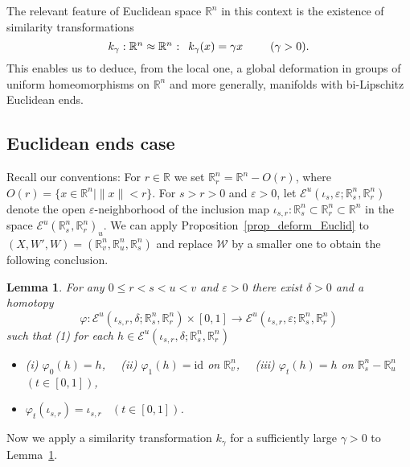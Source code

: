 \documentclass[11pt, fleqn]{amsart}
\newtheorem{lemma}{Lemma}[section]
\theoremstyle{definition}
\renewcommand{\phi}{\varphi}
\newcommand{\lra}{\longrightarrow}
\newcommand{\e}{\varepsilon}
\newcommand{\id}{\mathrm{id}}
\newcommand{\E}{\mathcal E}
\newcommand{\W}{\mathcal W}
\newcommand{\IR}{\mathbb R}
\begin{document}
The relevant feature of Euclidean space $\IR^n$ in this context is the existence of similarity transformations 
$$\mbox{$k_\gamma : \IR^n \approx \IR^n$ : \ $k_\gamma(x) = \gamma x$ \hspace{5mm} \ $(\gamma > 0)$.}$$
This enables us to deduce, from the local one, a global deformation in groups of uniform homeomorphisms on $\IR^n$ 
and more generally, manifolds with bi-Lipschitz Euclidean ends. 

\subsection{Euclidean ends case} \mbox{} 

Recall our conventions: For $r \in \IR$ we set $\IR^n_r = \IR^n - O(r)$, where $O(r) = \{ x \in \IR^n \mid \| x \| < r \}$. 
For $s > r > 0$ and $\e > 0$, let $\E^u(\iota_s, \e; \IR^n_s, \IR^n_r)$ denote the open $\e$-neighborhood of the inclusion map $\iota_{s,r} : \IR^n_s \subset \IR^n_r \subset \IR^n$ in the space $\E^u(\IR^n_s, \IR^n_r)_u.$
We can apply Proposition~\ref{prop_deform_Euclid} to $(X, W', W) = (\IR^n_v, \IR^n_u, \IR^n_s)$ and replace $\W$ by a smaller one to obtain the following conclusion. 

\begin{lemma}\label{lemma_local_deform_E-end} 
For any $0 \leq r < s < u < v$ and $\e > 0$ there exist $\delta > 0$ and a homotopy 
$$\phi : \E^u(\iota_{s,r}, \delta; \IR^n_s, \IR^n_r) \times [0,1] \lra \E^u(\iota_{s,r}, \e; \IR^n_s, \IR^n_r)$$ 
such that {\rm (1)} for each $h \in \E^u(\iota_{s,r}, \delta; \IR^n_s, \IR^n_r)$ 
\begin{itemize}
\item[] \hspace*{8mm} {\rm (i)} $\phi_0(h) = h$, \ \ {\rm (ii)} $\phi_1(h) = \id$ on $\IR^n_v$, \ \ 
{\rm (iii)} $\phi_t(h) = h$ on $\IR^n_s - \IR^n_u$ \ $(t \in [0,1])$,  

\item[(2)] $\phi_t(\iota_{s,r}) = \iota_{s,r}$ \ $(t \in [0,1])$.
\end{itemize} 
\end{lemma}

Now we apply a similarity transformation $k_\gamma$ for a sufficiently large $\gamma > 0$ to Lemma~\ref{lemma_local_deform_E-end}.
\end{document}
